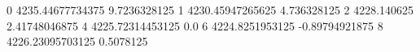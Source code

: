 0 4235.44677734375 9.7236328125
1 4230.45947265625 4.736328125
2 4228.140625 2.41748046875
4 4225.72314453125 0.0
6 4224.8251953125 -0.89794921875
8 4226.23095703125 0.5078125
